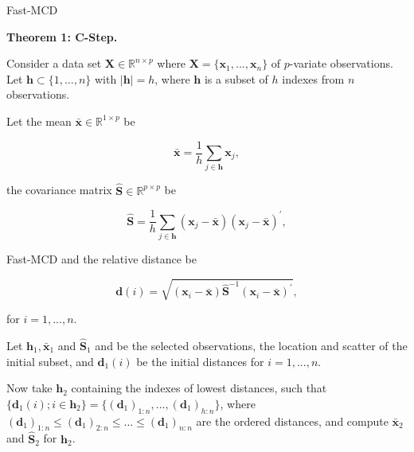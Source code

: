 \documentclass[newPxFont, numfooter, sectionpages]{beamer}
\begin{document}
\begin{frame}[c]{Fast-MCD}

	\textbf{Theorem 1: C-Step.} 

	Consider a data set $\boldsymbol{X} \in \mathbb{R}^{n \times p}$ where $\boldsymbol{X} = \{\boldsymbol{x}_1,...,\boldsymbol{x}_n\}$ of $p$-variate observations. Let $\boldsymbol{h} \subset \{1,...,n\}$ with $|\boldsymbol{h}| = h$, where $\boldsymbol{h}$ is a subset of $h$ indexes from $n$ observations.

	Let the mean $\bar{\boldsymbol{x}} \in \mathbb{R}^{1 \times p}$ be

	\begin{equation}\label{eq:eq02}
		\bar{\boldsymbol{x}} = \displaystyle\frac{1}{h}\displaystyle\sum_{j\in \boldsymbol{h}} \boldsymbol{x}_j, 
	\end{equation}

	the covariance matrix $\boldsymbol{\hat{S}} \in \mathbb{R}^{p \times p}$ be

	\begin{equation}\label{eq:eq03}
		\boldsymbol{\hat{S}} = \displaystyle\frac{1}{h}\displaystyle\sum_{j\in \boldsymbol{h}} (\boldsymbol{x}_j - \bar{\boldsymbol{x}})(\boldsymbol{x}_j - \bar{\boldsymbol{x}})^\prime,
	\end{equation}
\end{frame}

\begin{frame}[c]{Fast-MCD}
	and the relative distance be 	

	\begin{equation}\label{eq:eq04}
		\boldsymbol{d}(i) = \sqrt{(\boldsymbol{x}_i - \bar{\boldsymbol{x}}) \boldsymbol{\hat{S}}^{-1}(\boldsymbol{x}_i - \bar{\boldsymbol{x}})^\prime}, 
	\end{equation}

	for $i = 1,...,n$.

	Let $\boldsymbol{h}_1, \bar{\boldsymbol{x}}_1$ and $\boldsymbol{\hat{S}}_1$ and be the selected observations, the location and scatter of the initial subset, and $\boldsymbol{d}_1(i)$ be the initial distances for $i = 1,...,n$. 

	Now take $\boldsymbol{h}_2$ containing the indexes of lowest distances, such that $\{\boldsymbol{d}_1(i); i \in \boldsymbol{h}_2\} = \{(\boldsymbol{d}_1)_{1:n},...,(\boldsymbol{d}_1)_{h:n}\}$, where $(\boldsymbol{d}_1)_{1:n} \leq (\boldsymbol{d}_1)_{2:n} \leq ... \leq (\boldsymbol{d}_1)_{n:n}$ are the ordered distances, and compute $\boldsymbol{\bar{x}}_2$ and $\boldsymbol{\hat{S}}_2$ for $\boldsymbol{h}_2$.
	
\end{frame}
\end{document}
